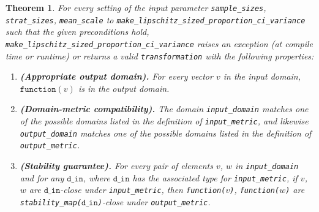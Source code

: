 \documentclass[11pt,a4paper]{article}
\newtheorem{theorem}{Theorem}[section]
\newcommand{\din}{\texttt{d\_in}}
\newcommand{\function}{\texttt{function}}
\begin{document}
\begin{theorem} For every setting of the input parameter \texttt{sample\_sizes}, \texttt{strat\_sizes}, \texttt{mean\_scale} to  \texttt{make\_lipschitz\_sized\_proportion\_ci\_variance} such that the given preconditions hold, \texttt{make\_lipschitz\_sized\_proportion\_ci\_variance} raises an exception (at compile time or runtime) or returns a valid \texttt{transformation} with the following properties:
    \begin{enumerate}
        \item \textbf{\textup{(Appropriate output domain).}} For every vector $v$ in the input domain, $\function(v)$ is in the output domain.
        
        \item \textbf{\textup{(Domain-metric compatibility).}} The domain \texttt{input\_domain} matches one of the possible domains listed in the definition of \texttt{input\_metric}, and likewise \texttt{output\_domain} matches one of the possible domains listed in the definition of \texttt{output\_metric}.
        
        \item \textbf{\textup{(Stability guarantee).} } For every pair of elements $v$, $w$ in \texttt{input\_domain} and for any $\din$,  where $\din$ has the associated type for \texttt{input\_metric}, if $v$, $w$ are $\din$-close under \texttt{input\_metric}, then \texttt{function($v$)}, \texttt{function($w$)} are \texttt{stability\_map($\din$)}-close under \texttt{output\_metric}.
    \end{enumerate}
\end{theorem}
\end{document}
